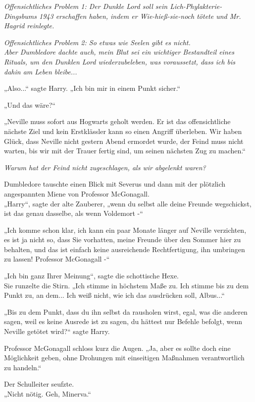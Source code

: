 {\emph{Offensichtliches Problem 1: Der Dunkle Lord soll sein Lich-Phylakterie-Dingsbums 1943 erschaffen haben, indem er Wie-hieß-sie-noch tötete und Mr. Hagrid reinlegte.}

\emph{Offensichtliches Problem 2: So etwas wie Seelen gibt es nicht.}\\ \emph{Aber Dumbledore dachte auch, mein Blut sei ein wichtiger Bestandteil eines Rituals, um den Dunklen Lord wiederzubeleben, was voraussetzt, dass ich bis dahin am Leben bleibe...}

„Also...“ sagte Harry. „Ich bin mir in einem Punkt sicher.“

„Und das wäre?“

„Neville muss sofort aus Hogwarts geholt werden. Er ist das offensichtliche nächste Ziel und kein Erstklässler kann so einen Angriff überleben. Wir haben Glück, dass Neville nicht gestern Abend ermordet wurde, der Feind muss nicht warten, bis wir mit der Trauer fertig sind, um seinen nächsten Zug zu machen.“

\emph{Warum hat der Feind nicht zugeschlagen, als wir abgelenkt waren?}

Dumbledore tauschte einen Blick mit Severus und dann mit der plötzlich angespannten Miene von Professor McGonagall.\\ „Harry“, sagte der alte Zauberer, „wenn du selbst alle deine Freunde wegschickst, ist das genau dasselbe, als wenn Voldemort -“

„Ich komme schon klar, ich kann ein paar Monate länger auf Neville verzichten, es ist ja nicht so, dass Sie vorhatten, meine Freunde über den Sommer hier zu behalten, und das ist einfach keine ausreichende Rechtfertigung, ihn umbringen zu lassen! Professor McGonagall -“

„Ich bin ganz Ihrer Meinung“, sagte die schottische Hexe.\\ Sie runzelte die Stirn. „Ich stimme in höchstem Maße zu. Ich stimme bis zu dem Punkt zu, an dem... Ich weiß nicht, wie ich das ausdrücken soll, Albus...“

„Bis zu dem Punkt, dass du ihn selbst da rausholen wirst, egal, was die anderen sagen, weil es keine Ausrede ist zu sagen, du hättest nur Befehle befolgt, wenn Neville getötet wird?“ sagte Harry.

Professor McGonagall schloss kurz die Augen. „Ja, aber es sollte doch eine Möglichkeit geben, ohne Drohungen mit einseitigen Maßnahmen verantwortlich zu handeln.“

Der Schulleiter seufzte.\\ „Nicht nötig. Geh, Minerva.“

}

